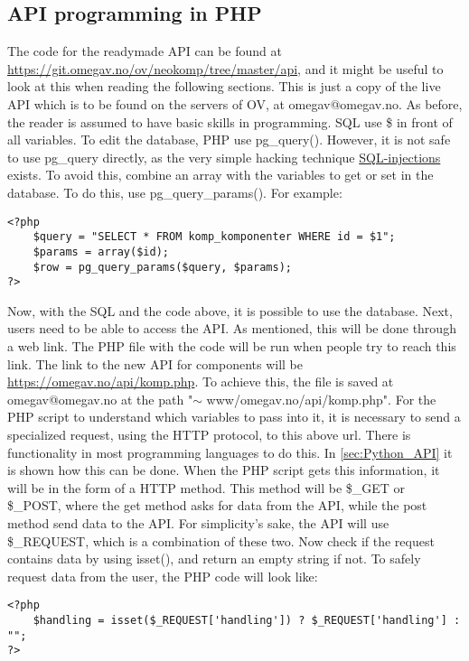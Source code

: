\subsection{API programming in PHP} \label{sec:API_PHP}
The code for the readymade API can be found at \url{https://git.omegav.no/ov/neokomp/tree/master/api}, and it might be useful to look at this when reading the following sections. This is just a copy of the live API which is to be found on the servers of OV, at omegav@omegav.no. 
As before, the reader is assumed to have basic skills in programming. SQL use \$ in front of all variables. To edit the database, PHP use pg\_query(). However, it is not safe to use pg\_query directly, as the very simple hacking technique \href{https://www.w3schools.com/sql/sql_injection.asp}{SQL-injections} exists. To avoid this, combine an array with the variables to get or set in the database. To do this, use pg\_query\_params(). For example:
\begin{verbatim}
<?php
    $query = "SELECT * FROM komp_komponenter WHERE id = $1";
    $params = array($id);
    $row = pg_query_params($query, $params);
?>
\end{verbatim}

Now, with the SQL and the code above, it is possible to use the database. Next, users need to be able to access the API. As mentioned, this will be done through a web link. The PHP file with the code will be run when people try to reach this link. The link to the new API for components will be \url{https://omegav.no/api/komp.php}. To achieve this, the file is saved at omegav@omegav.no at the path "$\sim$ www/omegav.no/api/komp.php". For the PHP script to understand which variables to pass into it, it is necessary to send a specialized request, using the HTTP protocol, to this above url. There is functionality in most programming languages to do this. In \cref{sec:Python_API} it is shown how this can be done. When the PHP script gets this information, it will be in the form of a HTTP method. This method will be \$\_GET or \$\_POST, where the get method asks for data from the API, while the post method send data to the API. For simplicity's sake, the API will use \$\_REQUEST, which is a combination of these two. Now check if the request contains data by using isset(), and return an empty string if not. To safely request data from the user, the PHP code will look like:
\begin{verbatim}
<?php
    $handling = isset($_REQUEST['handling']) ? $_REQUEST['handling'] : "";
?>
\end{verbatim}

